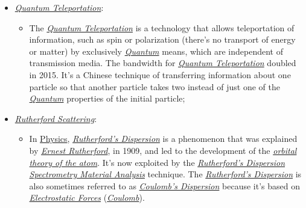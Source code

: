 \documentclass[conference]{IEEEtran}
\begin{document}
\begin{itemize}
  \item \href{https://en.wikipedia.org/wiki/Quantum_teleportation}{\textit{Quantum Teleportation}}:
    \begin{itemize}
        \item The \href{https://en.wikipedia.org/wiki/Quantum_teleportation}{\textit{Quantum Teleportation}} is a technology that allows teleportation of information, such as spin or polarization (there's no transport of energy or matter) by exclusively \href{https://en.wikipedia.org/wiki/Quantum}{\textit{Quantum}} means, which are independent of transmission media. The bandwidth for \href{https://en.wikipedia.org/wiki/Quantum_teleportation}{\textit{Quantum Teleportation}} doubled in 2015. It's a Chinese technique of transferring information about one particle so that another particle takes two instead of just one of the \href{https://en.wikipedia.org/wiki/Quantum}{\textit{Quantum}} properties of the initial particle;
    \end{itemize}

  \vspace{4pt}

  \item \href{https://en.wikipedia.org/wiki/Rutherford_scattering}{\textit{Rutherford Scattering}}:
    \begin{itemize}
        \item In \href{https://en.wikipedia.org/wiki/Physics}{Physics}, \href{https://en.wikipedia.org/wiki/Rutherford_scattering}{\textit{Rutherford's Dispersion}} is a phenomenon that was explained by \href{https://en.wikipedia.org/wiki/Ernest_Rutherford}{\textit{Ernest Rutherford}}, in 1909, and led to the development of the \href{https://en.wikipedia.org/wiki/Atomic_orbital}{\textit{orbital theory of the atom}}. It's now exploited by the \href{https://en.wikipedia.org/wiki/Rutherford_scattering}{\textit{Rutherford's Dispersion Spectrometry Material Analysis}} technique. The \href{https://en.wikipedia.org/wiki/Rutherford_scattering}{\textit{Rutherford's Dispersion}} is also sometimes referred to as \href{https://en.wikipedia.org/wiki/Rutherford_scattering}{\textit{Coulomb's Dispersion}} because it's based on \href{https://en.wikipedia.org/wiki/Electrostatics}{\textit{Electrostatic Forces}} (\href{https://en.wikipedia.org/wiki/Coulomb\%27s_law}{\textit{Coulomb}}).
    \end{itemize}
    
  \vspace{4pt}
    

\end{itemize}
\end{document}
